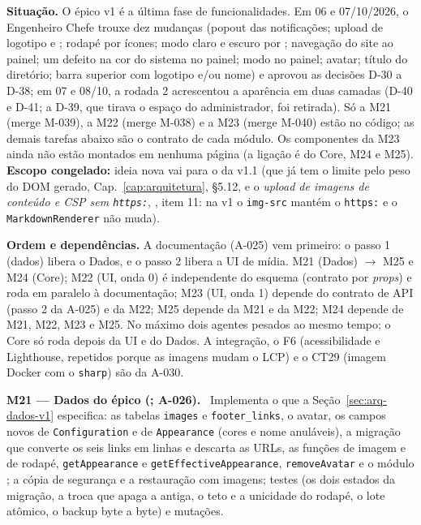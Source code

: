 \textbf{Situação.} O épico v1 é a última fase de funcionalidades. Em 06 e 07/10/2026, o Engenheiro Chefe trouxe dez mudanças (popout das notificações; upload de logotipo e ; rodapé por ícones; modo claro e escuro por ; navegação do site ao painel; um defeito na cor do sistema no painel; modo no painel; avatar; título do diretório; barra superior com logotipo e/ou nome) e aprovou as decisões D-30 a D-38; em 07 e 08/10, a rodada 2 acrescentou a aparência em duas camadas (D-40 e D-41; a D-39, que tirava o espaço do administrador, foi retirada). Só a M21 (merge M-039), a M22 (merge M-038) e a M23 (merge M-040) estão no código; as demais tarefas abaixo são o contrato de cada módulo. Os componentes da M23 ainda não estão montados em nenhuma página (a ligação é do Core, M24 e M25). \textbf{Escopo congelado:} ideia nova vai para o  da v1.1 (que já tem o limite pelo peso do DOM gerado, Cap.~\ref{cap:arquitetura}, \S5.12, e o \emph{upload de imagens de conteúdo e CSP sem \texttt{https:}}, , item 11: na v1 o \texttt{img-src} mantém o \texttt{https:} e o \texttt{MarkdownRenderer} não muda).

\textbf{Ordem e dependências.} A documentação (A-025) vem primeiro: o passo 1 (dados) libera o Dados, e o passo 2 libera a UI de mídia. M21 (Dados) $\rightarrow$ M25 e M24 (Core); M22 (UI, onda 0) é independente do esquema (contrato por \emph{props}) e roda em paralelo à documentação; M23 (UI, onda 1) depende do contrato de API (passo 2 da A-025) e da M22; M25 depende da M21 e da M22; M24 depende de M21, M22, M23 e M25. No máximo dois agentes pesados ao mesmo tempo; o Core só roda depois da UI e do Dados. A integração, o F6 (acessibilidade e Lighthouse, repetidos porque as imagens mudam o LCP) e o CT29 (imagem Docker com o \texttt{sharp}) são da A-030.

\textbf{M21 --- Dados do épico (; A-026).} \ Implementa o que a Seção~\ref{sec:arq-dados-v1} especifica: as tabelas \texttt{images} e \texttt{footer\_links}, o avatar, os campos novos de \texttt{Configuration} e de \texttt{Appearance} (cores e nome anuláveis), a migração que converte os seis links em linhas e descarta as URLs, as funções de imagem e de rodapé, \texttt{getAppearance} e \texttt{getEffectiveAppearance}, \texttt{removeAvatar} e o módulo ; a cópia de segurança e a restauração com imagens; testes (os dois estados da migração, a troca que apaga a antiga, o teto e a unicidade do rodapé, o lote atômico, o backup byte a byte) e mutações.


